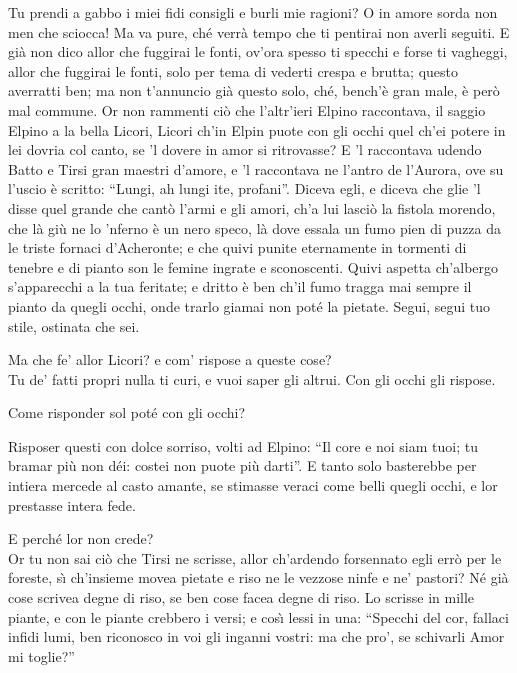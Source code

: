 \documentclass{book}
\begin{document}
	\2 Tu prendi a gabbo i miei fidi consigli
	e burli mie ragioni? O in amore
	sorda non men che sciocca! Ma va pure,
	ch\'e verr\`a tempo che ti pentirai
	non averli seguiti. E gi\`a non dico
	allor che fuggirai le fonti, ov'ora
	spesso ti specchi e forse ti vagheggi,
	allor che fuggirai le fonti, solo
	per tema di vederti crespa e brutta;
	questo averratti ben; ma non t'annuncio
	gi\`a questo solo, ch\'e, bench'\`e gran male,
	\`e per\`o mal commune. Or non rammenti
	ci\`o che l'altr'ieri Elpino raccontava,
	il saggio Elpino a la bella Licori,
	Licori ch'in Elpin puote con gli occhi
	quel ch'ei potere in lei dovria col canto,
	se 'l dovere in amor si ritrovasse?
	E 'l raccontava udendo Batto e Tirsi
	gran maestri d'amore, e 'l raccontava
	ne l'antro de l'Aurora, ove su l'uscio
	\`e scritto: ``Lungi, ah lungi ite, profani''.
	Diceva egli, e diceva che glie 'l disse
	quel grande che cant\`o l'armi e gli amori,
	ch'a lui lasci\`o la fistola morendo,
	che l\`a gi\`u ne lo 'nferno \`e un nero speco,
	l\`a dove essala un fumo pien di puzza
	da le triste fornaci d'Acheronte;
	e che quivi punite eternamente
	in tormenti di tenebre e di pianto
	son le femine ingrate e sconoscenti.
	Quivi aspetta ch'albergo s'apparecchi
	a la tua feritate;
	e dritto \`e ben ch'il fumo
	tragga mai sempre il pianto da quegli occhi,
	onde trarlo giamai
	non pot\'e la pietate.
	Segui, segui tuo stile,
	ostinata che sei.

	\3 Ma che fe' allor Licori? e com' rispose
	a queste cose? \\

   \2 Tu de' fatti propri
	nulla ti curi, e vuoi saper gli altrui.
	Con gli occhi gli rispose.

	\3 Come risponder sol pot\'e con gli occhi?

	\2 Risposer questi con dolce sorriso,
	volti ad Elpino: ``Il core e noi siam tuoi;
	tu bramar pi\`u non d\'ei: costei non puote
	pi\`u darti''. E tanto solo basterebbe
	per intiera mercede al casto amante,
	se stimasse veraci come belli
	quegli occhi, e lor prestasse intera fede.

	\3 E perch\'e lor non crede? \\

   \2 Or tu non sai
	ci\`o che Tirsi ne scrisse, allor ch'ardendo
	forsennato egli err\`o per le foreste,
	s\`{\i} ch'insieme movea pietate e riso
	ne le vezzose ninfe e ne' pastori?
	N\'e gi\`a cose scrivea degne di riso,
	se ben cose facea degne di riso.
	Lo scrisse in mille piante, e con le piante
	crebbero i versi; e cos\`{\i} lessi in una:
	``Specchi del cor, fallaci infidi lumi,
	ben riconosco in voi gli inganni vostri:
	ma che pro', se schivarli Amor mi toglie?''
\end{document}

